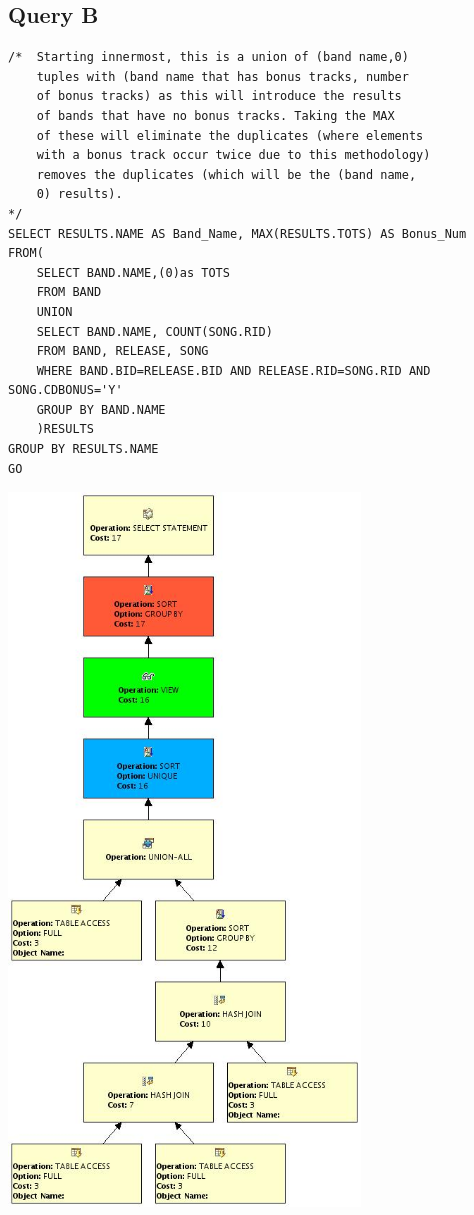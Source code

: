 \documentclass{report}
\begin{document}
\subsection*{Query B}
\begin{verbatim}
/*  Starting innermost, this is a union of (band name,0)
    tuples with (band name that has bonus tracks, number 
    of bonus tracks) as this will introduce the results
    of bands that have no bonus tracks. Taking the MAX
    of these will eliminate the duplicates (where elements
    with a bonus track occur twice due to this methodology)
    removes the duplicates (which will be the (band name,
    0) results).
*/
SELECT RESULTS.NAME AS Band_Name, MAX(RESULTS.TOTS) AS Bonus_Num
FROM(
    SELECT BAND.NAME,(0)as TOTS
    FROM BAND
    UNION
    SELECT BAND.NAME, COUNT(SONG.RID)
    FROM BAND, RELEASE, SONG
    WHERE BAND.BID=RELEASE.BID AND RELEASE.RID=SONG.RID AND
SONG.CDBONUS='Y'
    GROUP BY BAND.NAME
    )RESULTS
GROUP BY RESULTS.NAME
GO
\end{verbatim}
\includegraphics[width=0.7\textwidth]{Q2}
\end{document}
